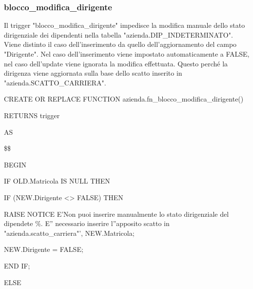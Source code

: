        \newpage

        \subsubsection{blocco\_modifica\_dirigente}
        Il trigger "blocco\_modifica\_dirigente" impedisce la modifica manuale dello stato dirigenziale dei dipendenti nella tabella "azienda.DIP\_INDETERMINATO". \\
        Viene distinto il caso dell'inserimento da quello dell'aggiornamento del campo "Dirigente". Nel caso dell'inserimento viene impostato automaticamente a FALSE, nel caso dell'update viene ignorata la modifica effettuata. Questo perché la dirigenza viene aggiornata sulla base dello scatto inserito in "azienda.SCATTO\_CARRIERA".
        \ttfamily
            \begin{flushleft}
                \begin{description}
                    \item CREATE OR REPLACE FUNCTION azienda.fn\_blocco\_modifica\_dirigente()  
                    \item RETURNS trigger
                    \item AS
                    \item \$\$
                    \item BEGIN 
                    \begin{description}
                        \item IF OLD.Matricola IS NULL THEN
                        \begin{description}
                            \item IF (NEW.Dirigente <> FALSE) THEN
                            \begin{description}
                                \item RAISE NOTICE E'Non puoi inserire manualmente lo stato dirigenziale del dipendete \%. E'' necessario inserire l''apposito scatto in "azienda.scatto\_carriera"', NEW.Matricola;
                                \item  NEW.Dirigente = FALSE;
                            \end{description}
                            \item END IF;
                        \end{description}
                        \item ELSE
                        \begin{description}

\end{description}
\end{description}
\end{description}
\end{flushleft}
